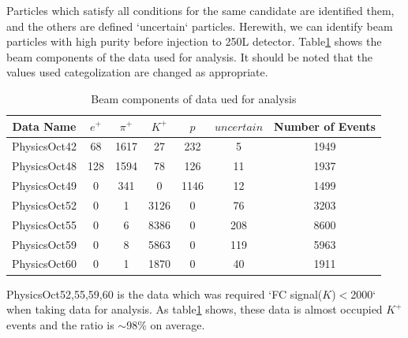 Particles which satisfy all conditions for the same candidate are identified them,
and the others are defined `uncertain` particles.
Herewith, we can identify beam particles with high purity before injection to 250L detector.
Table\ref{tb:component} shows the beam components of the data used for analysis.
It should be noted that the values used categolization are changed as appropriate.\\

\begin{table}
  \centering
  \begin{tabular}[htb]{ccccccc}\hline
    Data Name    & $e^{+}$ & $\pi^{+}$ & $K^{+}$ & $p$   & $uncertain$ & Number of Events \\ \hline
    PhysicsOct42 & 68      & 1617      & 27      & 232   & 5           & 1949             \\
    PhysicsOct48 & 128     & 1594      & 78      & 126   & 11          & 1937             \\
    PhysicsOct49 & 0       & 341       & 0       & 1146  & 12          & 1499             \\
    PhysicsOct52 & 0       & 1         & 3126    & 0     & 76          & 3203             \\
    PhysicsOct55 & 0       & 6         & 8386    & 0     & 208         & 8600             \\
    PhysicsOct59 & 0       & 8         & 5863    & 0     & 119         & 5963             \\
    PhysicsOct60 & 0       & 1         & 1870    & 0     & 40          & 1911             \\ \hline
  \end{tabular}
  \label{tb:component}
  \caption{Beam components of data ued for analysis}
\end{table}

PhysicsOct52,55,59,60 is the data which was required `FC signal($K$)$<$2000` when taking data for analysis.
As table\ref{tb:component} shows, these data is almost occupied $K^{+}$ events and the ratio is $\sim$98\% on average.